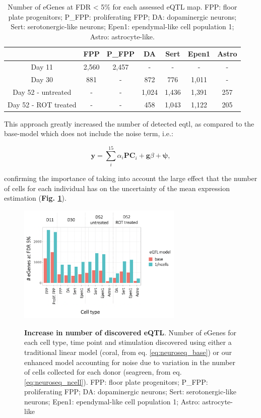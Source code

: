 \begin{table}[h]
    \centering
    \begin{tabular}{c|c c c c c c}
    &         FPP & P\_FPP & DA & Sert & Epen1 & Astro \\
    \hline
    Day 11  & 2,560 & 2,457 & - & - & - & - \\
    Day 30  & 881 & - &  872 & 776 & 1,011 & -  \\
    Day 52 - untreated & - & - & 1,024 & 1,436 & 1,391 & 257 \\
    Day 52 - ROT treated & - & -  & 458 & 1,043 & 1,122 & 205 \\
    \end{tabular}
    \caption[Number of eGenes across contexts]{Number of eGenes at FDR < 5\% for each assessed eQTL map.
    FPP: floor plate progenitors; P\_FPP: proliferating FPP; DA: dopaminergic neurons; Sert: serotonergic-like neurons; Epen1: ependymal-like cell population 1; Astro: astrocyte-like.}
    \label{tab:eqtl_results}
\end{table}

This approach greatly increased the number of detected \gls{eqtl}, as compared to the base-model which does not include the noise term, i.e.:

\begin{equation}\label{eq:neuroseq_base}
    \mathbf{y} = \sum_i^{15}\alpha_i \mathbf{PC}_i + \mathbf{g}\beta + \boldsymbol{\psi},
\end{equation}

confirming the importance of taking into account the large effect that the number of cells for each individual has on the uncertainty of the mean expression estimation (\textbf{Fig. \ref{fig:neuroseq_eqtl_improved_power}}). 

\begin{figure}
\caption[Increase in number of discovered eQTL]{\textbf{Increase in number of discovered eQTL}.
Number of eGenes for each cell type, time point and stimulation discovered using either a traditional linear model (coral, from eq. \eqref{eq:neuroseq_base}) or our enhanced model accounting for noise due to variation in the number of cells collected for each donor (seagreen, from eq. \eqref{eq:neuroseq_ncell}).
FPP: floor plate progenitors; P\_FPP: proliferating FPP; DA: dopaminergic neurons; Sert: serotonergic-like neurons; Epen1: ependymal-like cell population 1; Astro: astrocyte-like}
\includegraphics[width=0.7\textwidth]{Chapter5/Fig/neuroseq_improved_eqtl_power.png}
\label{fig:neuroseq_eqtl_improved_power}
\end{figure}

